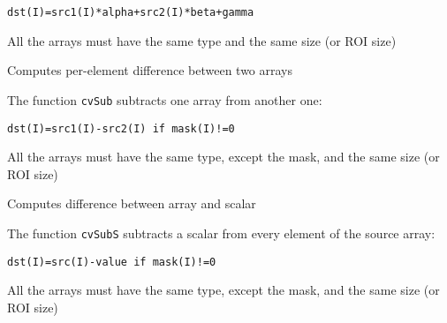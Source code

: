 \begin{lstlisting}
dst(I)=src1(I)*alpha+src2(I)*beta+gamma
\end{lstlisting}

All the arrays must have the same type and the same size (or ROI size)



Computes per-element difference between two arrays


\begin{description}
\end{description}


The function \texttt{cvSub} subtracts one array from another one:

\begin{lstlisting}
dst(I)=src1(I)-src2(I) if mask(I)!=0
\end{lstlisting}

All the arrays must have the same type, except the mask, and the same size (or ROI size)


Computes difference between array and scalar


\begin{description}
\end{description}

The function \texttt{cvSubS} subtracts a scalar from every element of the source array:

\begin{lstlisting}
dst(I)=src(I)-value if mask(I)!=0
\end{lstlisting}

All the arrays must have the same type, except the mask, and the same size (or ROI size)


